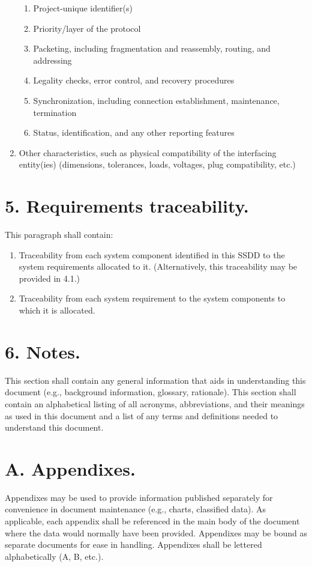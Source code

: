 \begin{enumerate}
  \begin{enumerate}
  \itemsep1pt\parskip0pt
  \item
    Project-unique identifier(s)
  \item
    Priority/layer of the protocol
  \item
    Packeting, including fragmentation and reassembly, routing, and
    addressing
  \item
    Legality checks, error control, and recovery procedures
  \item
    Synchronization, including connection establishment, maintenance,
    termination
  \item
    Status, identification, and any other reporting features
  \end{enumerate}
\item
  Other characteristics, such as physical compatibility of the
  interfacing entity(ies) (dimensions, tolerances, loads, voltages, plug
  compatibility, etc.)
\end{enumerate}

\section{5. Requirements traceability.}

This paragraph shall contain:

\begin{enumerate}
\itemsep1pt\parskip0pt
\item
  Traceability from each system component identified in this SSDD to the
  system requirements allocated to it. (Alternatively, this traceability
  may be provided in 4.1.)
\item
  Traceability from each system requirement to the system components to
  which it is allocated.
\end{enumerate}

\section{6. Notes.}

This section shall contain any general information that aids in
understanding this document (e.g., background information, glossary,
rationale). This section shall contain an alphabetical listing of all
acronyms, abbreviations, and their meanings as used in this document and
a list of any terms and definitions needed to understand this document.

\section{A. Appendixes.}

Appendixes may be used to provide information published separately for
convenience in document maintenance (e.g., charts, classified data). As
applicable, each appendix shall be referenced in the main body of the
document where the data would normally have been provided. Appendixes
may be bound as separate documents for ease in handling. Appendixes
shall be lettered alphabetically (A, B, etc.).
